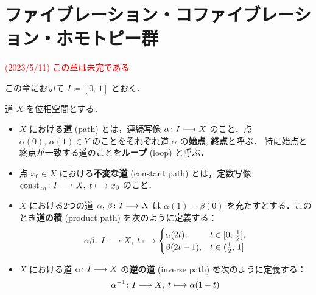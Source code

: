 \documentclass[algtopo_main]{subfiles}
\begin{document}
\setcounter{chapter}{6}

\chapter{ファイブレーション・コファイブレーション・ホモトピー群}
\textcolor{red}{(2023/5/11) この章は未完である}

この章において $I \coloneqq [0,\, 1]$ とおく．
\begin{mydef}[label=def:path-basic, breakable]{道}
    $X$ を位相空間とする．
    \begin{itemize}
        \item $X$ における\textbf{道} (path) とは，連続写像 $\alpha \colon I \longrightarrow X$ のこと．点 $\alpha(0),\, \alpha(1) \in Y$ のことをそれぞれ道 $\alpha$ の\textbf{始点}, \textbf{終点}と呼ぶ．
        特に始点と終点が一致する道のことを\textbf{ループ} (loop) と呼ぶ．
        \item 点 $x_0 \in X$ における\textbf{不変な道} (constant path) とは，定数写像 $\mathrm{const}_{x_0} \colon I \longrightarrow X,\; t \longmapsto x_0$ のこと．
        \item $X$ における2つの道 $\alpha,\, \beta \colon I \longrightarrow X$ は $\alpha(1) = \beta(0)$ を充たすとする．このとき\textbf{道の積} (product path) を次のように定義する：
        \begin{align}
            \alpha\beta \colon I \longrightarrow X,\; t \longmapsto 
            \begin{cases}
                \alpha(2t), & t \in [0,\, \frac{1}{2}], \\
                \beta(2t-1), & t \in (\frac{1}{2},\, 1]
            \end{cases}
        \end{align}
        \item $X$ における道 $\alpha \colon I \longrightarrow X$ の\textbf{逆の道} (inverse path) を次のように定義する：
        \begin{align}
            \alpha^{-1} \colon I \longrightarrow X,\; t \longmapsto \alpha(1-t)
        \end{align}
    \end{itemize}
\end{mydef}
\end{document}

